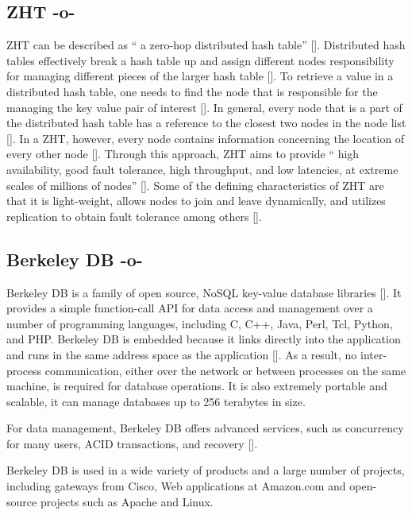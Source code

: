 \subsection{ZHT -o-}

ZHT can be described as `` a zero-hop distributed hash
table'' [\cite{datasys}]. Distributed hash tables effectively break a
hash table up and assign different nodes responsibility for managing
different pieces of the larger hash table [\cite{wiley}]. To retrieve a
value in a distributed hash table, one needs to find the node that is
responsible for the managing the key value pair of
interest [\cite{wiley}]. In general, every node that is a part of the
distributed hash table has a reference to the closest two nodes in the
node list [\cite{wiley}]. In a ZHT, however, every node contains
information concerning the location of every other
node [\cite{Li}]. Through this approach, ZHT aims to provide `` high
availability, good fault tolerance, high throughput, and low
latencies, at extreme scales of millions of nodes'' [\cite{Li}].  Some
of the defining characteristics of ZHT are that it is light-weight,
allows nodes to join and leave dynamically, and utilizes replication
to obtain fault tolerance among others [\cite{Li}].


     
\subsection{Berkeley DB -o-}

Berkeley DB is a family of open source, NoSQL key-value database
libraries [\cite{www-bdb-wiki}]. It provides a simple function-call API
for data access and management over a number of programming languages,
including C, C++, Java, Perl, Tcl, Python, and PHP. Berkeley DB is
embedded because it links directly into the application and runs in
the same address space as the application [\cite{www-bdb-stanford}]. As
a result, no inter-process communication, either over the network or
between processes on the same machine, is required for database
operations. It is also extremely portable and scalable, it can manage
databases up to 256 terabytes in size.
     
For data management, Berkeley DB offers advanced services, such as
concurrency for many users, ACID transactions, and
recovery [\cite{www-bdb}].
     
Berkeley DB is used in a wide variety of products and a large number
of projects, including gateways from Cisco, Web applications at
Amazon.com and open-source projects such as Apache and Linux.



